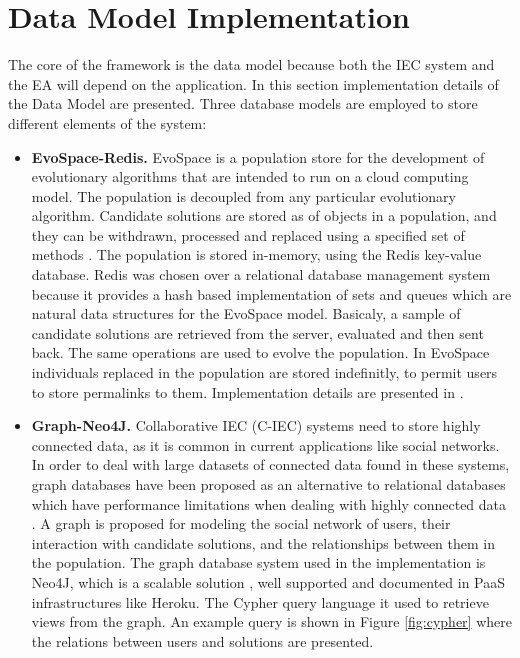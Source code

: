 \section{Data Model Implementation}
\label{sec:implementation}

The core of the framework is the data model because both the IEC system and the EA will 
depend on the application. In this section implementation details of the Data Model are presented.
Three database models are employed to store different elements of the system: 

\begin{itemize}
\item {\bf EvoSpace-Redis.} 
EvoSpace is a population store \cite{Evospace}  for the development of 
evolutionary algorithms that are intended to run on a cloud computing model. 
The population is decoupled from any particular evolutionary algorithm. 
Candidate solutions are stored as of objects in a population, and they can be withdrawn, 
processed and replaced using a specified set of methods \cite{GValdez2015}. The population
is stored in-memory, using the Redis key-value database. Redis was chosen over a relational 
database management system because it provides a hash based implementation of sets and 
queues which are natural data structures for the EvoSpace model. Basicaly, a sample of 
candidate solutions are retrieved from the server, evaluated and then sent back. 
The same operations are used to evolve the population. In EvoSpace individuals replaced 
in the population are stored indefinitly, to permit users to store permalinks to them.
Implementation details are presented in \cite{garcia2013evospace}.

\item {\bf Graph-Neo4J.} 
 Collaborative IEC (C-IEC) systems need to store highly connected data, as it is common 
 in current applications like social networks. In order to deal with large datasets of connected 
 data found in these systems, graph databases \cite{angles2012comparison} have been proposed 
 as an alternative to relational databases which have performance limitations when dealing with 
 highly connected data \cite{holzschuher2013performance}.
 A graph is proposed for modeling the social network of users, their interaction with 
 candidate solutions, and the relationships between them in the population.
 The graph database system used in the implementation is Neo4J, which is
 a scalable solution \cite{miller2013graph,holzschuher2013performance}, well 
 supported and documented in PaaS infrastructures like Heroku. The Cypher query 
 language it used to retrieve views from the graph.
 An example query is shown in Figure \ref{fig:cypher} where the relations 
 between users and solutions are presented.
  

\end{itemize}
